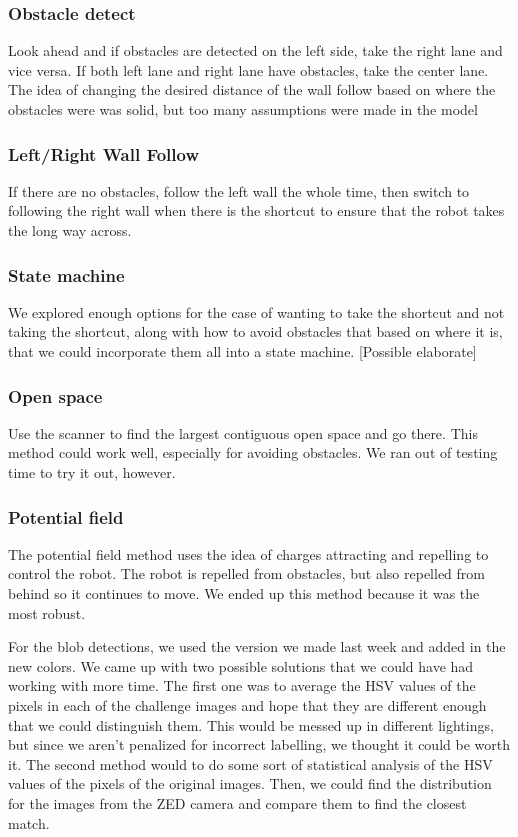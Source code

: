 \documentclass[journal, a4paper]{IEEEtran}
\begin{document}
\subsubsection{Obstacle detect}
Look ahead and if obstacles are detected on the left side, take the right lane and vice versa. If both left lane and right lane have obstacles, take the center lane. The idea of changing the desired distance of the wall follow based on where the obstacles were was solid, but too many assumptions were made in the model
\subsubsection{Left/Right Wall Follow}
If there are no obstacles, follow the left wall the whole time, then switch to following the right wall when there is the shortcut to ensure that the robot takes the long way across.
\subsubsection{State machine}
We explored enough options for the case of wanting to take the shortcut and not taking the shortcut, along with how to avoid obstacles that based on where it is, that we could incorporate them all into a state machine. [Possible elaborate]
\subsubsection{Open space}
Use the scanner to find the largest contiguous open space and go there. This method could work well, especially for avoiding obstacles. We ran out of testing time to try it out, however. 
\subsubsection{Potential field}
The potential field method uses the idea of charges attracting and repelling to control the robot. The robot is repelled from obstacles, but also repelled from behind so it continues to move. We ended up this method because it was the most robust.

For the blob detections, we used the version we made last week and added in the new colors. We came up with two possible solutions that we could have had working with more time. The first one was to average the HSV values of the pixels in each of the challenge images and hope that they are different enough that we could distinguish them. This would be messed up in different lightings, but since we aren’t penalized for incorrect labelling, we thought it could be worth it. The second method would to do some sort of statistical analysis of the HSV values of the pixels of the original images. Then, we could find the distribution for the images from the ZED camera and compare them to find the closest match. 
\end{document}
